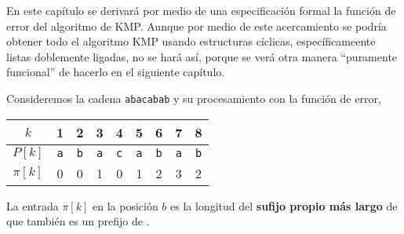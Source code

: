 En este capítulo se derivará por medio de una especificación formal la función de error del
algoritmo de KMP. Aunque por medio de este acercamiento\cite{bird:cyclic} se podría obtener todo
el algoritmo KMP usando estructuras cíclicas, específicameente listas doblemente ligadas, no se
hará así, porque se verá otra manera ``puramente funcional'' de hacerlo en el siguiente capítulo.

Consideremos la cadena \texttt{abacabab} y su procesamiento con la función de error,

\begin{table}[h]
\centering
\begin{tabular}{c|c|c|c|c|c|c|c|c|}
\cline{2-9}
$k$      & 1          & 2          & 3          & 4          & 5          & 6          & 7          & 8          \\ \hline
$P[k]$   & \texttt{a} & \texttt{b} & \texttt{a} & \texttt{c} & \texttt{a} & \texttt{b} & \texttt{a} & \texttt{b} \\ \hline
$\pi[k]$ & 0          & 0          & 1          & 0          & 1          & 2          & 3          & 2          \\ \cline{2-9} 
\end{tabular}
\end{table}

La entrada $\pi[k]$ en la posición $b$ es la longitud del \textbf{sufijo propio más largo} de
 que también es un prefijo de .

